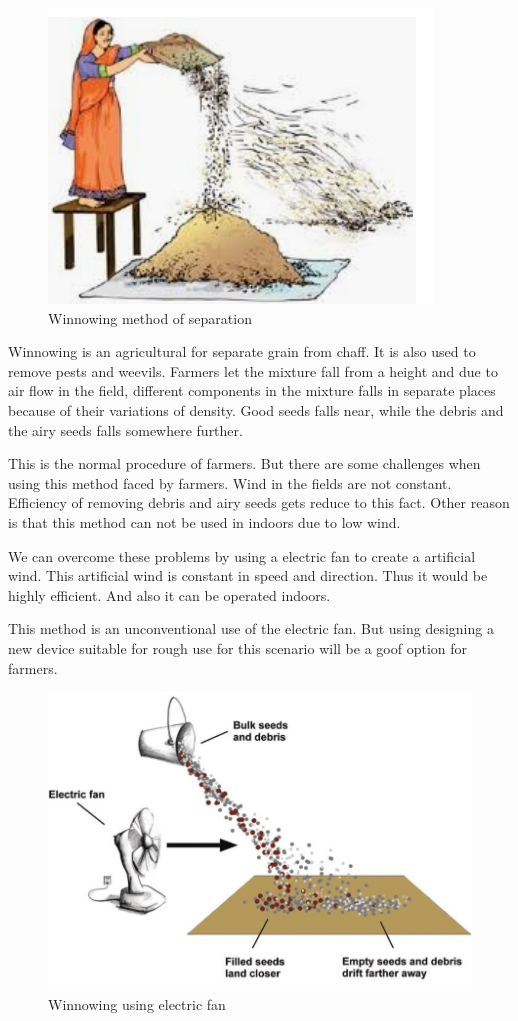 \documentclass[12pt]{article}
\begin{document}
\begin{figure}[h!]
  \centering
  \includegraphics[width=0.5\linewidth]{winnowing seedss.png}
  \caption{Winnowing method of separation}
  \label{fig:Winnowing method of seperation}
\end{figure}

Winnowing is an agricultural for separate grain from chaff. It is also used to remove pests and weevils. Farmers let the mixture fall from a height and due to air flow in the field, different components in the mixture falls in separate places because of their variations of density. Good seeds falls near, while the debris and the airy seeds falls somewhere further. 

This is the normal procedure of farmers. But there are some challenges when using this method faced by farmers. Wind in the fields are not constant. Efficiency of removing debris and airy seeds gets reduce to this fact. Other reason is that this method can not be used in indoors due to low wind. 

We can overcome these problems by using a electric fan to create a artificial wind. This artificial wind is constant in speed and direction. Thus it would be highly efficient. And also it can be operated indoors. 

This method is an unconventional use of the electric fan. But using designing a new device suitable for rough use for this scenario will be a goof option for farmers. 

\newpage
\begin{figure}[h!]
  \centering
  \includegraphics[width=\linewidth]{solution.jpg}
  \caption{Winnowing using electric fan}
  \label{fig:Winnowing using electric fan}
\end{figure}
\newpage
\end{document}
